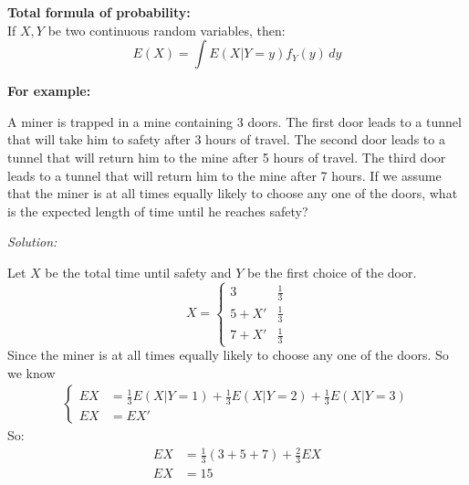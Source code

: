 \documentclass{article}
\begin{document}
\begin{theorem}
    \textbf{Total formula of probability:}\\
    If $X,Y$ be two continuous random variables, then:
    \begin{equation*}
        E(X) = \int E(X|Y = y)f_Y(y) \, dy
    \end{equation*}
\end{theorem}

\textbf{For example:}

A miner is trapped in a mine containing 3 doors. The first door leads to a tunnel that will take him to safety after 3 hours of travel. The second door leads to a tunnel that will return him to the mine after 5 hours of travel. The third door leads to a tunnel that will return him to the mine after 7 hours. If we assume that the miner is at all times equally likely to choose any one of the doors, what is the expected length of time until he reaches safety?

\emph{Solution:}

Let $X$ be the total time until safety and $Y$ be the first choice of the door.
\begin{equation*}
    X = \begin{cases}
        3 & \frac{1}{3} \\
        5+X' & \frac{1}{3} \\
        7+X' & \frac{1}{3}
    \end{cases}
\end{equation*}
Since the miner is at all times equally likely to choose any one of the doors. So we know
\begin{align*}
    \begin{cases}
        EX &= \frac{1}{3}E(X|Y=1) + \frac{1}{3}E(X|Y=2) + \frac{1}{3}E(X|Y=3) \\
        EX &= EX'
    \end{cases}
\end{align*}
So:
\begin{align*}
    EX &= \frac{1}{3}(3+5+7) + \frac{2}{3}EX \\
    EX &= 15
\end{align*}
\end{document}
